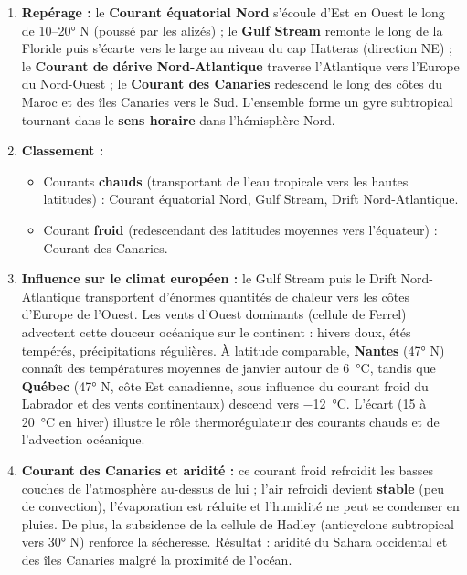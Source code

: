 \documentclass[11pt]{article}
\newcommand{\cle}[1]{{\popxbold\color{popdark}#1}}
\begin{document}
\begin{corrige}
\begin{enumerate}
    \item \textbf{Repérage :} le \textbf{Courant équatorial Nord} s'écoule d'Est en Ouest le long de 10–20° N (poussé par les alizés) ; le \textbf{Gulf Stream} remonte le long de la Floride puis s'écarte vers le large au niveau du cap Hatteras (direction NE) ; le \textbf{Courant de dérive Nord-Atlantique} traverse l'Atlantique vers l'Europe du Nord-Ouest ; le \textbf{Courant des Canaries} redescend le long des côtes du Maroc et des îles Canaries vers le Sud. L'ensemble forme un \cle{gyre subtropical} tournant dans le \textbf{sens horaire} dans l'hémisphère Nord.
    \item \textbf{Classement :}
    \begin{itemize}
        \item Courants \textbf{chauds} (transportant de l'eau tropicale vers les hautes latitudes) : Courant équatorial Nord, Gulf Stream, Drift Nord-Atlantique.
        \item Courant \textbf{froid} (redescendant des latitudes moyennes vers l'équateur) : Courant des Canaries.
    \end{itemize}
    \item \textbf{Influence sur le climat européen :} le Gulf Stream puis le Drift Nord-Atlantique transportent d'énormes quantités de chaleur vers les côtes d'Europe de l'Ouest. Les \cle{vents d'Ouest} dominants (cellule de Ferrel) advectent cette douceur océanique sur le continent : hivers doux, étés tempérés, précipitations régulières. À latitude comparable, \textbf{Nantes} (47° N) connaît des températures moyennes de janvier autour de \SI{6}{\celsius}, tandis que \textbf{Québec} (47° N, côte Est canadienne, sous influence du courant froid du Labrador et des vents continentaux) descend vers \SI{-12}{\celsius}. L'écart (15 à \SI{20}{\celsius} en hiver) illustre le rôle thermorégulateur des courants chauds et de l'advection océanique.
    \item \textbf{Courant des Canaries et aridité :} ce courant froid refroidit les basses couches de l'atmosphère au-dessus de lui ; l'air refroidi devient \textbf{stable} (peu de convection), l'évaporation est réduite et l'humidité ne peut se condenser en pluies. De plus, la subsidence de la cellule de Hadley (anticyclone subtropical vers 30° N) renforce la sécheresse. Résultat : aridité du Sahara occidental et des îles Canaries malgré la proximité de l'océan.
\end{enumerate}
\end{corrige}
\end{document}
